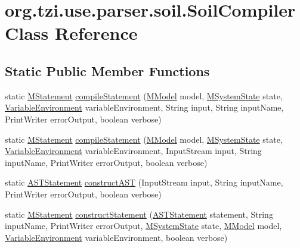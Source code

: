 \hypertarget{classorg_1_1tzi_1_1use_1_1parser_1_1soil_1_1_soil_compiler}{\section{org.\-tzi.\-use.\-parser.\-soil.\-Soil\-Compiler Class Reference}
\label{classorg_1_1tzi_1_1use_1_1parser_1_1soil_1_1_soil_compiler}
}
\subsection*{Static Public Member Functions}
\begin{DoxyCompactItemize}
\item 
static \hyperlink{classorg_1_1tzi_1_1use_1_1uml_1_1sys_1_1soil_1_1_m_statement}{M\-Statement} \hyperlink{classorg_1_1tzi_1_1use_1_1parser_1_1soil_1_1_soil_compiler_a9d787bfd7ba56e919e9e1aeec2c3d5ce}{compile\-Statement} (\hyperlink{classorg_1_1tzi_1_1use_1_1uml_1_1mm_1_1_m_model}{M\-Model} model, \hyperlink{classorg_1_1tzi_1_1use_1_1uml_1_1sys_1_1_m_system_state}{M\-System\-State} state, \hyperlink{classorg_1_1tzi_1_1use_1_1util_1_1soil_1_1_variable_environment}{Variable\-Environment} variable\-Environment, String input, String input\-Name, Print\-Writer error\-Output, boolean verbose)
\item 
static \hyperlink{classorg_1_1tzi_1_1use_1_1uml_1_1sys_1_1soil_1_1_m_statement}{M\-Statement} \hyperlink{classorg_1_1tzi_1_1use_1_1parser_1_1soil_1_1_soil_compiler_afd913d359e451da00862a7e81eeeb8a5}{compile\-Statement} (\hyperlink{classorg_1_1tzi_1_1use_1_1uml_1_1mm_1_1_m_model}{M\-Model} model, \hyperlink{classorg_1_1tzi_1_1use_1_1uml_1_1sys_1_1_m_system_state}{M\-System\-State} state, \hyperlink{classorg_1_1tzi_1_1use_1_1util_1_1soil_1_1_variable_environment}{Variable\-Environment} variable\-Environment, Input\-Stream input, String input\-Name, Print\-Writer error\-Output, boolean verbose)
\item 
static \hyperlink{classorg_1_1tzi_1_1use_1_1parser_1_1soil_1_1ast_1_1_a_s_t_statement}{A\-S\-T\-Statement} \hyperlink{classorg_1_1tzi_1_1use_1_1parser_1_1soil_1_1_soil_compiler_aee8fe3c0b7c69130a8769d1c6ee05796}{construct\-A\-S\-T} (Input\-Stream input, String input\-Name, Print\-Writer error\-Output, boolean verbose)
\item 
static \hyperlink{classorg_1_1tzi_1_1use_1_1uml_1_1sys_1_1soil_1_1_m_statement}{M\-Statement} \hyperlink{classorg_1_1tzi_1_1use_1_1parser_1_1soil_1_1_soil_compiler_ab431a6daac8bb9989a4f9dbcd6927ae5}{construct\-Statement} (\hyperlink{classorg_1_1tzi_1_1use_1_1parser_1_1soil_1_1ast_1_1_a_s_t_statement}{A\-S\-T\-Statement} statement, String input\-Name, Print\-Writer error\-Output, \hyperlink{classorg_1_1tzi_1_1use_1_1uml_1_1sys_1_1_m_system_state}{M\-System\-State} state, \hyperlink{classorg_1_1tzi_1_1use_1_1uml_1_1mm_1_1_m_model}{M\-Model} model, \hyperlink{classorg_1_1tzi_1_1use_1_1util_1_1soil_1_1_variable_environment}{Variable\-Environment} variable\-Environment, boolean verbose)
\end{DoxyCompactItemize}


